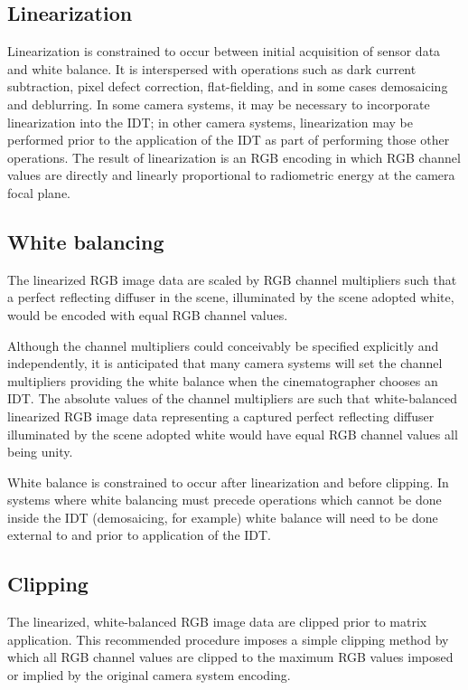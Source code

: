 \subsection{Linearization}
Linearization is constrained to occur between initial acquisition of sensor data and white balance. It is interspersed with operations such as dark current subtraction, pixel defect correction, flat-fielding, and in some cases demosaicing and deblurring. In some camera systems, it may be necessary to incorporate linearization into the IDT; in other camera systems, linearization may be performed prior to the application of the IDT as part of performing those other operations. The result of linearization is an RGB encoding in which RGB channel values are directly and linearly proportional to radiometric energy at the camera focal plane.

\subsection{White balancing}
The linearized RGB image data are scaled by RGB channel multipliers such that a perfect reflecting diffuser in the scene, illuminated by the scene adopted white, would be encoded with equal RGB channel values.

Although the channel multipliers could conceivably be specified explicitly and independently, it is anticipated that many camera systems will set the channel multipliers providing the white balance when the cinematographer chooses an IDT. The absolute values of the channel multipliers are such that white-balanced linearized RGB image data representing a captured perfect reflecting diffuser illuminated by the scene adopted white would have equal RGB channel values all being unity.

White balance is constrained to occur after linearization and before clipping. In systems where white balancing must precede operations which cannot be done inside the IDT (demosaicing, for example) white balance will need to be done external to and prior to application of the IDT.

\subsection{Clipping}
The linearized, white-balanced RGB image data are clipped prior to matrix application. This recommended procedure imposes a simple clipping method by which all RGB channel values are clipped to the maximum RGB values imposed or implied by the original camera system encoding.

